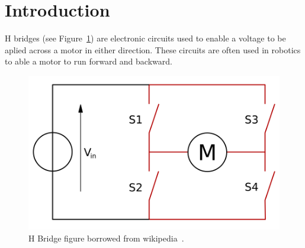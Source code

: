 \section{\textbf{Introduction}}\label{sec:1}
	

	H bridges (see Figure~\ref{fig:bridge}) are electronic circuits used to enable a voltage to be aplied across a motor in either direction. These circuits are often used in robotics to able a motor to run forward and backward.

\begin{figure}[t]
\centering
	\centering%
	\includegraphics[height=.25\textwidth]{img/H_bridge.png}
	\caption{H Bridge figure borrowed from wikipedia~\cite{WIKI}.}\label{fig:bridge}%
\end{figure}


